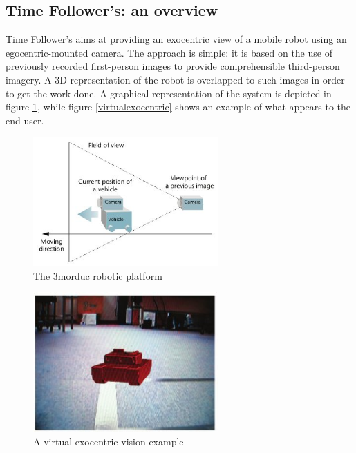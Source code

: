 \subsection{Time Follower's: an overview}
Time Follower's aims at providing an exocentric view of a mobile 
robot using an egocentric-mounted camera. The approach is simple: it is 
based on the use of previously recorded first-person images to provide 
comprehensible third-person imagery. A 3D representation of the robot 
is overlapped to such images in order to get the work done. A graphical
representation of the system is depicted in figure \ref{fig:exocentric}, 
while figure \ref{virtualexocentric} shows an example of what appears 
to the end user.
%
\begin{figure}[!h]
  \begin{center}
    \includegraphics[width=200pt]{img/exocentric_vision.jpg}
    \caption{The 3morduc robotic platform}
    \label{fig:exocentric}
  \end{center}
\end{figure}
%
\begin{figure}[!h]
  \begin{center}
    \includegraphics[width=200pt]{img/virtual_exocentric.jpg}  %
    \caption{A virtual exocentric vision example}
    \label{fig:virtualexocentric}
  \end{center}
\end{figure}
%

